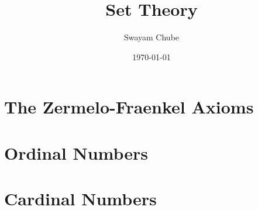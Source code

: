 \documentclass[oneside,a4paper]{report}
\title{Set Theory}
\author{Swayam Chube}
\date{\today}
\begin{document}
\maketitle
\tableofcontents

\chapter{The Zermelo-Fraenkel Axioms}


\chapter{Ordinal Numbers}


\chapter{Cardinal Numbers}

\end{document}
